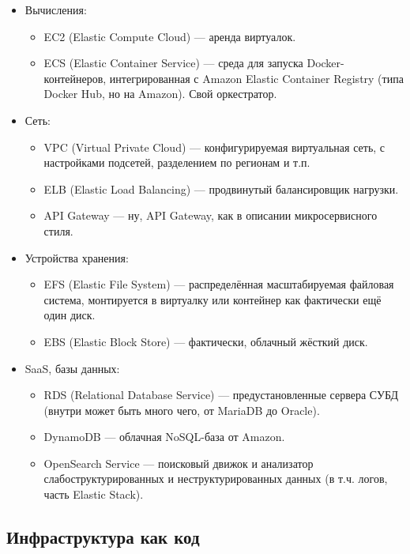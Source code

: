 \documentclass[a5paper]{article}
\begin{document}
\begin{itemize}
    \item Вычисления:
    \begin{itemize}
        \item EC2 (Elastic Compute Cloud) --- аренда виртуалок.
        \item ECS (Elastic Container Service) --- среда для запуска Docker-контейнеров, интегрированная с Amazon Elastic Container Registry (типа Docker Hub, но на Amazon). Свой оркестратор.
    \end{itemize}
    \item Сеть:
    \begin{itemize}
        \item VPC (Virtual Private Cloud) --- конфигурируемая виртуальная сеть, с настройками подсетей, разделением по регионам и т.п.
        \item ELB (Elastic Load Balancing) --- продвинутый балансировщик нагрузки.
        \item API Gateway --- ну, API Gateway, как в описании микросервисного стиля.
    \end{itemize}
    \item Устройства хранения:
    \begin{itemize}
        \item EFS (Elastic File System) --- распределённая масштабируемая файловая система, монтируется в виртуалку или контейнер как фактически ещё один диск.
        \item EBS (Elastic Block Store) --- фактически, облачный жёсткий диск.
    \end{itemize}
    \item SaaS, базы данных:
    \begin{itemize}
        \item RDS (Relational Database Service) --- предустановленные сервера СУБД (внутри может быть много чего, от MariaDB до Oracle).
        \item DynamoDB --- облачная NoSQL-база от Amazon.
        \item OpenSearch Service --- поисковый движок и анализатор слабоструктурированных и неструктурированных данных (в т.ч. логов, часть Elastic Stack).
    \end{itemize}
\end{itemize}

\subsection{Инфраструктура как код}
\end{document}
